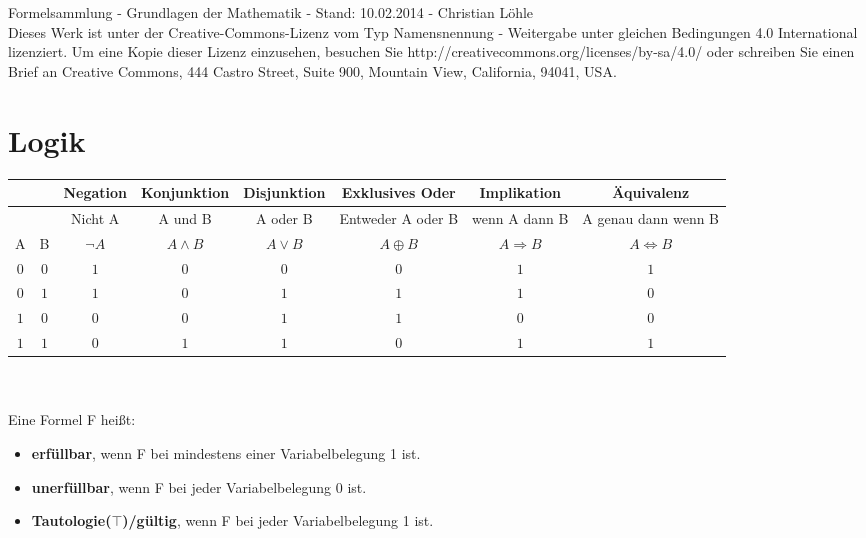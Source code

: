 \documentclass[11pt]{article}
\begin{document}
Formelsammlung - Grundlagen der Mathematik - Stand: 10.02.2014 - Christian L{\"o}hle\\
\footnotesize Dieses Werk ist unter der Creative-Commons-Lizenz vom Typ Namensnennung - Weitergabe unter gleichen Bedingungen 4.0 International lizenziert. Um eine Kopie dieser Lizenz einzusehen, besuchen Sie http://creativecommons.org/licenses/by-sa/4.0/ oder schreiben Sie einen Brief an Creative Commons, 444 Castro Street, Suite 900, Mountain View, California, 94041, USA.\normalsize

\section{Logik}
\begin{tabular}{|c|c|c|c|c|c|c|c|} \hline
&& Negation & Konjunktion & Disjunktion & Exklusives Oder & Implikation & {\"A}quivalenz\\ \hline
&& Nicht A & A und B & A oder B & Entweder A oder B & wenn A dann B & A genau dann wenn B\\ \hline
A & B & $\neg A$  &  $A \land B$ & $A \lor B$ &  $A \oplus B$ & $A \Rightarrow B$ & $A \Leftrightarrow B$ \\ \hline
$0$ & $0$ & $1$ & $0$ & $0$ & $0$ & $1$ & $1$ \\ \hline
$0$ & $1$ & $1$ & $0$ & $1$ & $1$ & $1$ & $0$ \\ \hline
$1$ & $0$ & $0$ & $0$ & $1$ & $1$ & $0$ & $0$ \\ \hline
$1$ & $1$ & $0$ & $1$ & $1$ & $0$ & $1$ & $1$ \\ \hline
\end{tabular}\\ \\
Eine Formel F hei{\ss}t:
\begin{itemize}\itemsep0em\small
\item {\bfseries erf{\"u}llbar}, wenn F bei mindestens einer Variabelbelegung 1 ist.\\
\item {\bfseries unerf{\"u}llbar}, wenn F bei jeder Variabelbelegung 0 ist.\\
\item {\bfseries Tautologie($\top$)/g{\"u}ltig}, wenn F bei jeder Variabelbelegung 1 ist.
\end{itemize}\normalsize
\end{document}
